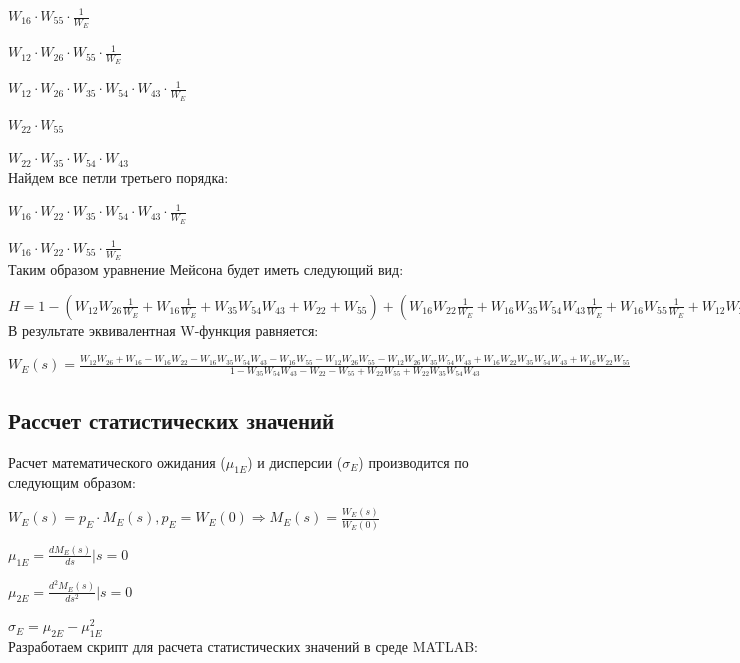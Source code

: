 \documentclass[14pt,a4paper,report]{report}
\begin{document}
$W_{16}\cdot W_{55}\cdot \frac{1}{W_E}$

$W_{12}\cdot W_{26}\cdot W_{55}\cdot \frac{1}{W_E}$ 

$W_{12}\cdot W_{26}\cdot W_{35}\cdot W_{54}\cdot W_{43}\cdot \frac{1}{W_E}$

$W_{22}\cdot W_{55}$

$W_{22}\cdot W_{35}\cdot W_{54} \cdot W_{43}$\\

Найдем все петли третьего порядка:

$W_{16}\cdot W_{22}\cdot W_{35}\cdot W_{54}\cdot W_{43}\cdot \frac{1}{W_E}$

$W_{16}\cdot W_{22}\cdot W_{55}\cdot \frac{1}{W_E}$\\

Таким образом уравнение Мейсона будет иметь следующий вид:

$H=1-(W_{12}W_{26}\frac{1}{W_E}+W_{16}\frac{1}{W_E}+W_{35}W_{54}W_{43}+W_{22}+W_{55})+(W_{16}W_{22}\frac{1}{W_E}+W_{16}W_{35}W_{54}W_{43}\frac{1}{W_E}+W_{16}W_{55}\frac{1}{W_E}+W_{12}W_{26}W_{55}\frac{1}{W_E}+W_{12}W_{26}W_{35}W_{54}W_{43}\frac{1}{W_E}+W_{22}W_{55}+W_{22}W_{35}W_{54} W_{43})-(W_{16}W_{22}W_{35}W_{54}W_{43}\frac{1}{W_E}+W_{16}W_{22}W_{55}\frac{1}{W_E})$\\

В результате эквивалентная W-функция равняется:

$W_E(s)=\frac{W_{12}W_{26}+W_{16}-W_{16}W_{22}-W_{16}W_{35}W_{54}W_{43}-W_{16}W_{55}-W_{12}W_{26}W_{55}-W_{12}W_{26}W_{35}W_{54}W_{43}+W_{16}W_{22}W_{35}W_{54}W_{43}+W_{16}W_{22}W_{55}}{1-W_{35}W_{54}W_{43}-W_{22}-W_{55}+W_{22}W_{55}+W_{22}W_{35}W_{54} W_{43}}$\\

\subsection{Рассчет статистических значений}

Расчет математического ожидания ($\mu_{1E}$) и дисперсии ($\sigma_E$) производится по следующим образом:

$W_E(s)=p_E\cdot M_E(s), p_E=W_E(0)\Longrightarrow M_E(s)=\frac{W_E(s)}{W_E(0)}$

$\mu_{1E}=\frac{d M_E(s)}{ds}|s=0$

$\mu_{2E}=\frac{d^2 M_E(s)}{ds^2}|s=0$

$\sigma_E=\mu_{2E}-\mu_{1E}^2$\\

Разработаем скрипт для расчета статистических значений в среде MATLAB:
\end{document}
